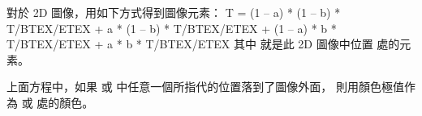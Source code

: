 對於 2D 圖像，用如下方式得到圖像元素：
\startclc[indentnext=no]
T = (1 – a) * (1 – b) * T/BTEX/ETEX
    + a * (1 – b) * T/BTEX/ETEX
    + (1 – a) * b * T/BTEX/ETEX
    + a * b * T/BTEX/ETEX
\stopclc
其中  就是此 2D 圖像中位置  處的元素。

上面方程中，如果  或  中任意一個所指代的位置落到了圖像外面，
則用顏色極值作為  或  處的顏色。
